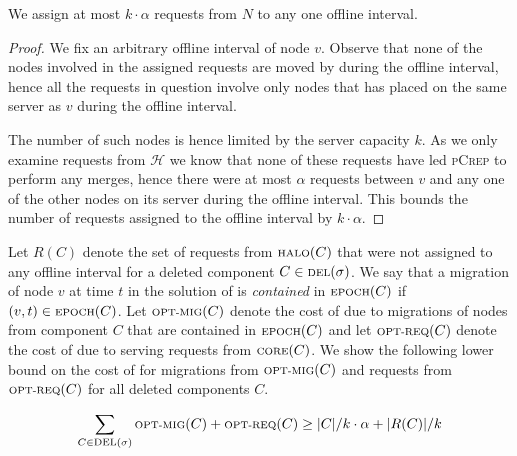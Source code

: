 \documentclass[a4paper,UKenglish,cleveref, autoref, thm-restate,authorcolumns]{lipics-v2019}
\newcommand{\adjDel}{\textsc{pCrep}}
\newcommand{\optmig}{\text{\scriptsize OPT-MIG}}
\newcommand{\optreq}{\text{\scriptsize OPT-REQ}}
\newcommand{\del}{\text{\scriptsize DEL}}
\newcommand{\opt}{\text{O{\scriptsize PT}}}
\newcommand{\core}{\text{\scriptsize CORE}}
\newcommand{\halo}{\text{\scriptsize HALO}}
\newcommand{\epoch}{\text{\scriptsize EPOCH}}
\begin{document}
\begin{lemma}
	\label{offl_int_lemma}
	We assign at most $k\cdot\alpha$ requests from $N$ to any one offline interval.
\end{lemma}

\begin{proof}
	We fix an arbitrary offline interval of node $v$. Observe that none of the nodes involved in the assigned requests are moved by \opt{} during the offline interval, hence all the requests in question involve only nodes that \opt{} has placed on the same server as $v$ during the offline interval. 
	
	The number of such nodes is hence limited by the server capacity $k$. As we only examine requests from $\mathcal{H}$ we know that none of these requests have led \adjDel{} to perform any merges, hence there were at most $\alpha$ requests between $v$ and any one of the other nodes on its server during the offline interval. This bounds the number of requests assigned to the offline interval by $k\cdot\alpha$.
\end{proof}

Let $R(C)$ denote the set of requests from $\halo(C)$ that were not assigned to any offline interval for a deleted component $C\in\del(\sigma)$.
We say that a migration of node $v$ at time $t$ in the solution of \opt{} is \textit{contained} in $\epoch(C)$ if $(v,t)\in\epoch(C)$.
Let $\optmig(C)$ denote the cost of \opt{} due to migrations of nodes from component $C$ that are contained in $\epoch(C)$ and let $\optreq(C)$ denote the cost of \opt{} due to serving requests from $\core(C)$.
We show the following lower bound on the cost of \opt{} for migrations from $\optmig(C)$ and requests from $\optreq(C)$ for all deleted components $C$.

\begin{lemma}
	\label{opt_c_mig_req_lemma}
	\begin{align*}
	\sum_{C\in\del(\sigma)}\optmig(C)+\optreq(C)\geq |C|/k\cdot\alpha+|R(C)|/k
	\end{align*}
\end{lemma}
\end{document}
